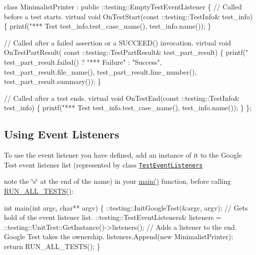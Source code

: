 \begin{DoxyCode}
class MinimalistPrinter : public ::testing::EmptyTestEventListener \{
  // Called before a test starts.
  virtual void OnTestStart(const ::testing::TestInfo& test\_info) \{
    printf("*** Test %
           test\_info.test\_case\_name(), test\_info.name());
  \}

  // Called after a failed assertion or a SUCCEED() invocation.
  virtual void OnTestPartResult(
      const ::testing::TestPartResult& test\_part\_result) \{
    printf("%
           test\_part\_result.failed() ? "*** Failure" : "Success",
           test\_part\_result.file\_name(),
           test\_part\_result.line\_number(),
           test\_part\_result.summary());
  \}

  // Called after a test ends.
  virtual void OnTestEnd(const ::testing::TestInfo& test\_info) \{
    printf("*** Test %
           test\_info.test\_case\_name(), test\_info.name());
  \}
\};
\end{DoxyCode}


\subsection*{Using Event Listeners}

To use the event listener you have defined, add an instance of it to the Google Test event listener list (represented by class \href{../include/gtest/gtest.h#L929}{\tt Test\+Event\+Listeners}
\begin{DoxyItemize}
\item note the \char`\"{}s\char`\"{} at the end of the name) in your {\ttfamily \hyperlink{app_2main_8cpp_ae66f6b31b5ad750f1fe042a706a4e3d4}{main()}} function, before calling {\ttfamily \hyperlink{gtest_8h_a853a3792807489591d3d4a2f2ff9359f}{R\+U\+N\+\_\+\+A\+L\+L\+\_\+\+T\+E\+S\+T\+S()}}\+: 
\begin{DoxyCode}
int main(int argc, char** argv) \{
  ::testing::InitGoogleTest(&argc, argv);
  // Gets hold of the event listener list.
  ::testing::TestEventListeners& listeners =
      ::testing::UnitTest::GetInstance()->listeners();
  // Adds a listener to the end.  Google Test takes the ownership.
  listeners.Append(new MinimalistPrinter);
  return RUN\_ALL\_TESTS();
\}
\end{DoxyCode}

\end{DoxyItemize}

